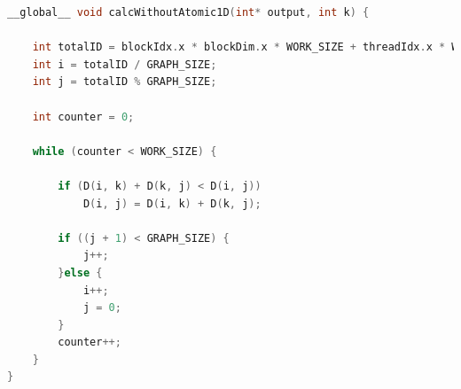 \documentclass[conference]{IEEEtran}
\begin{document}
\begin{lstlisting}[language=C++, caption=Parallel GPU]
__global__ void calcWithoutAtomic1D(int* output, int k) {

	int totalID = blockIdx.x * blockDim.x * WORK_SIZE + threadIdx.x * WORK_SIZE;
	int i = totalID / GRAPH_SIZE;
	int j = totalID % GRAPH_SIZE;

	int counter = 0;
	
	while (counter < WORK_SIZE)	{
	
		if (D(i, k) + D(k, j) < D(i, j))
			D(i, j) = D(i, k) + D(k, j);
			
		if ((j + 1) < GRAPH_SIZE) {
			j++;
		}else {
			i++;
			j = 0;
		}
		counter++;
	}
}
\end{lstlisting}
\end{document}
